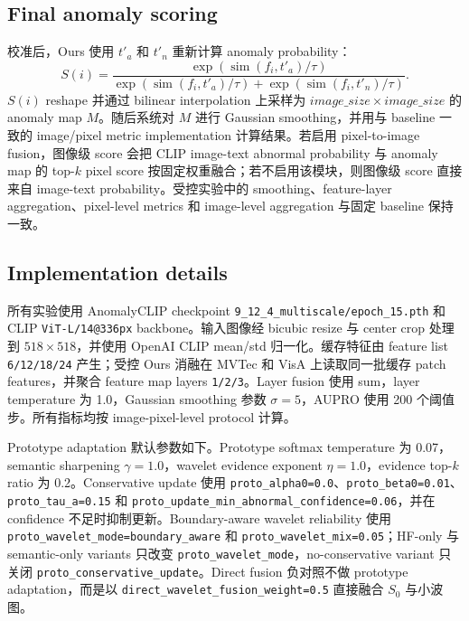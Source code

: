 \documentclass[10pt,a4paper,fontset=none]{ctexart}
\newcommand{\simi}{\operatorname{sim}}
\begin{document}
\subsection{Final anomaly scoring}

校准后，Ours 使用 $t'_a$ 和 $t'_n$ 重新计算 anomaly probability：
\begin{equation}
S(i)=
\frac{\exp(\simi(f_i,t'_a)/\tau)}
{\exp(\simi(f_i,t'_a)/\tau)+\exp(\simi(f_i,t'_n)/\tau)} .
\end{equation}
$S(i)$ reshape 并通过 bilinear interpolation 上采样为 $image\_size\times image\_size$ 的 anomaly map $M$。随后系统对 $M$ 进行 Gaussian smoothing，并用与 baseline 一致的 image/pixel metric implementation 计算结果。若启用 pixel-to-image fusion，图像级 score 会把 CLIP image-text abnormal probability 与 anomaly map 的 top-$k$ pixel score 按固定权重融合；若不启用该模块，则图像级 score 直接来自 image-text probability。受控实验中的 smoothing、feature-layer aggregation、pixel-level metrics 和 image-level aggregation 与固定 baseline 保持一致。

\subsection{Implementation details}

所有实验使用 AnomalyCLIP checkpoint \texttt{9\_12\_4\_multiscale/epoch\_15.pth} 和 CLIP \texttt{ViT-L/14@336px} backbone。输入图像经 bicubic resize 与 center crop 处理到 $518\times518$，并使用 OpenAI CLIP mean/std 归一化。缓存特征由 feature list \texttt{6/12/18/24} 产生；受控 Ours 消融在 MVTec 和 VisA 上读取同一批缓存 patch features，并聚合 feature map layers \texttt{1/2/3}。Layer fusion 使用 sum，layer temperature 为 1.0，Gaussian smoothing 参数 $\sigma=5$，AUPRO 使用 200 个阈值步。所有指标均按 image-pixel-level protocol 计算。

Prototype adaptation 默认参数如下。Prototype softmax temperature 为 0.07，semantic sharpening $\gamma=1.0$，wavelet evidence exponent $\eta=1.0$，evidence top-$k$ ratio 为 0.2。Conservative update 使用 \texttt{proto\_alpha0=0.0}、\texttt{proto\_beta0=0.01}、\texttt{proto\_tau\_a=0.15} 和 \texttt{proto\_update\_min\_abnormal\_confidence=0.06}，并在 confidence 不足时抑制更新。Boundary-aware wavelet reliability 使用 \texttt{proto\_wavelet\_mode=boundary\_aware} 和 \texttt{proto\_wavelet\_mix=0.05}；HF-only 与 semantic-only variants 只改变 \texttt{proto\_wavelet\_mode}，no-conservative variant 只关闭 \texttt{proto\_conservative\_update}。Direct fusion 负对照不做 prototype adaptation，而是以 \texttt{direct\_wavelet\_fusion\_weight=0.5} 直接融合 $S_0$ 与小波图。
\end{document}
